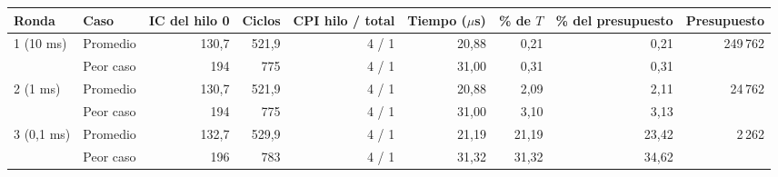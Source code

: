 \begin{tabular}{llrrrrrrr}
\toprule
Ronda & Caso & IC del hilo 0 & Ciclos & CPI hilo / total & Tiempo ($\mu$s) & \% de $T$ & \% del presupuesto & Presupuesto \\
\midrule
1 (10 ms) & Promedio & 130{,}7 & 521{,}9 & 4 / 1 & 20{,}88 & 0{,}21 & 0{,}21 & 249\,762 \\
 & Peor caso & 194 & 775 & 4 / 1 & 31{,}00 & 0{,}31 & 0{,}31 &  \\
2 (1 ms) & Promedio & 130{,}7 & 521{,}9 & 4 / 1 & 20{,}88 & 2{,}09 & 2{,}11 & 24\,762 \\
 & Peor caso & 194 & 775 & 4 / 1 & 31{,}00 & 3{,}10 & 3{,}13 &  \\
3 (0,1 ms) & Promedio & 132{,}7 & 529{,}9 & 4 / 1 & 21{,}19 & 21{,}19 & 23{,}42 & 2\,262 \\
 & Peor caso & 196 & 783 & 4 / 1 & 31{,}32 & 31{,}32 & 34{,}62 &  \\
\bottomrule
\end{tabular}
